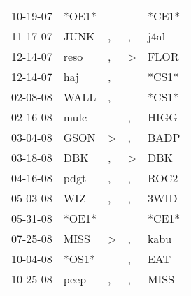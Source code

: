 \begin{supertabular}{p{0.07\textwidth}p{0.06\textwidth}p{0.02\textwidth}p{0.02\textwidth}p{0.06\textwidth}}
          10-19-07\textsuperscript{} &                            *OE1* &                  &                  &                            *CE1* \\
          11-17-07\textsuperscript{} &           JUNK\textsuperscript{} &                , &                , &           j4al\textsuperscript{} \\
          12-14-07\textsuperscript{} &           reso\textsuperscript{} &                , &     \textgreater &           FLOR\textsuperscript{} \\
          12-14-07\textsuperscript{} &            haj\textsuperscript{} &                , &                  &                            *CS1* \\
          02-08-08\textsuperscript{} &           WALL\textsuperscript{} &                , &                  &                            *CS1* \\
          02-16-08\textsuperscript{} &           mulc\textsuperscript{} &                  &                , &           HIGG\textsuperscript{} \\
          03-04-08\textsuperscript{} &           GSON\textsuperscript{} &     \textgreater &                , &           BADP\textsuperscript{} \\
          03-18-08\textsuperscript{} &            DBK\textsuperscript{} &                , &     \textgreater &            DBK\textsuperscript{} \\
          04-16-08\textsuperscript{} &           pdgt\textsuperscript{} &                , &                , &           ROC2\textsuperscript{} \\
          05-03-08\textsuperscript{} &            WIZ\textsuperscript{} &                , &                , &           3WID\textsuperscript{} \\
          05-31-08\textsuperscript{} &                            *OE1* &                  &                  &                            *CE1* \\
          07-25-08\textsuperscript{} &           MISS\textsuperscript{} &     \textgreater &                , &           kabu\textsuperscript{} \\
          10-04-08\textsuperscript{} &                            *OS1* &                  &                , &            EAT\textsuperscript{} \\
          10-25-08\textsuperscript{} &           peep\textsuperscript{} &                , &                , &           MISS\textsuperscript{} \\

\end{supertabular}
